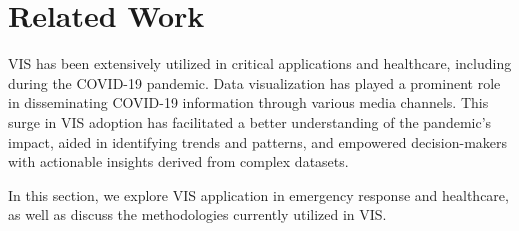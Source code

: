 \section{Related Work}

VIS has been extensively utilized in critical applications and healthcare, including during the COVID-19 pandemic.
Data visualization has played a prominent role in disseminating COVID-19 information through various media channels.
This surge in VIS adoption has facilitated a better understanding of the pandemic's impact, aided in identifying trends and patterns, and empowered decision-makers with actionable insights derived from complex datasets.

In this section, we explore VIS application in emergency response and healthcare, as well as discuss the methodologies currently utilized in VIS.